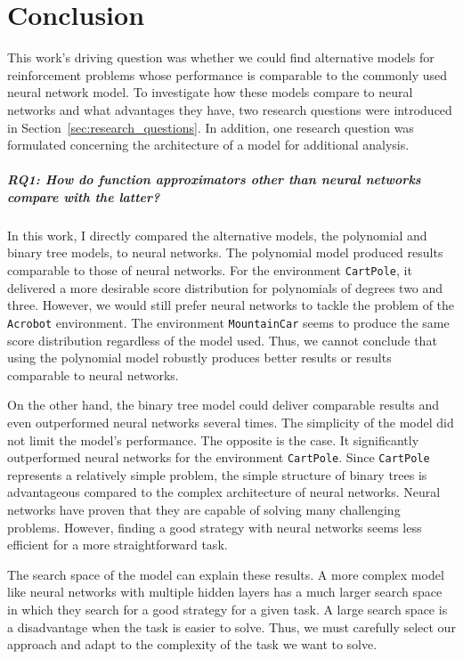 
\chapter{Conclusion}
\label{ch:conclusions}

This work's driving question was whether we could find alternative models for reinforcement problems whose performance is comparable to the commonly used neural network model. To investigate how these models compare to neural networks and what advantages they have, two research questions were introduced in Section~\ref{sec:research_questions}. In addition, one research question was formulated concerning the architecture of a model for additional analysis.

\paragraph*{RQ1: How do function approximators other than neural networks compare with the latter?} In this work, I directly compared the alternative models, the polynomial and binary tree models, to neural networks. The polynomial model produced results comparable to those of neural networks. For the environment \verb|CartPole|, it delivered a more desirable score distribution for polynomials of degrees two and three. However, we would still prefer neural networks to tackle the problem of the \verb|Acrobot| environment. The environment \verb|MountainCar| seems to produce the same score distribution regardless of the model used. Thus, we cannot conclude that using the polynomial model robustly produces better results or results comparable to neural networks.

On the other hand, the binary tree model could deliver comparable results and even outperformed neural networks several times. The simplicity of the model did not limit the model's performance. The opposite is the case. It significantly outperformed neural networks for the environment \verb|CartPole|. Since \verb|CartPole| represents a relatively simple problem, the simple structure of binary trees is advantageous compared to the complex architecture of neural networks. Neural networks have proven that they are capable of solving many challenging problems. However, finding a good strategy with neural networks seems less efficient for a more straightforward task.

The search space of the model can explain these results. A more complex model like neural networks with multiple hidden layers has a much larger search space in which they search for a good strategy for a given task. A large search space is a disadvantage when the task is easier to solve. Thus, we must carefully select our approach and adapt to the complexity of the task we want to solve.

